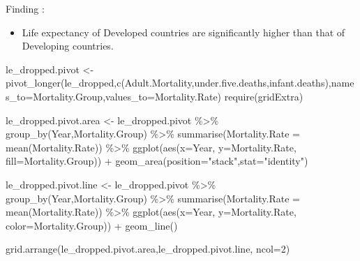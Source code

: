 \documentclass[
]{article}
\newenvironment{Shaded}{\begin{snugshade}}{\end{snugshade}}
\newcommand{\AttributeTok}[1]{\textcolor[rgb]{0.77,0.63,0.00}{#1}}
\newcommand{\DecValTok}[1]{\textcolor[rgb]{0.00,0.00,0.81}{#1}}
\newcommand{\FunctionTok}[1]{\textcolor[rgb]{0.00,0.00,0.00}{#1}}
\newcommand{\NormalTok}[1]{#1}
\newcommand{\OtherTok}[1]{\textcolor[rgb]{0.56,0.35,0.01}{#1}}
\newcommand{\SpecialCharTok}[1]{\textcolor[rgb]{0.00,0.00,0.00}{#1}}
\newcommand{\StringTok}[1]{\textcolor[rgb]{0.31,0.60,0.02}{#1}}
\providecommand{\tightlist}{%
  \setlength{\itemsep}{0pt}\setlength{\parskip}{0pt}}
\begin{document}
Finding :

\begin{itemize}
\tightlist
\item
  Life expectancy of Developed countries are significantly higher than
  that of Developing countries.
\end{itemize}

\begin{Shaded}
\begin{Highlighting}[]
\NormalTok{le\_dropped.pivot }\OtherTok{\textless{}{-}} \FunctionTok{pivot\_longer}\NormalTok{(le\_dropped,}\FunctionTok{c}\NormalTok{(Adult.Mortality,under.five.deaths,infant.deaths),}\AttributeTok{names\_to=}\StringTok{\textquotesingle{}Mortality.Group\textquotesingle{}}\NormalTok{,}\AttributeTok{values\_to=}\StringTok{\textquotesingle{}Mortality.Rate\textquotesingle{}}\NormalTok{)}
\FunctionTok{require}\NormalTok{(gridExtra)}

\NormalTok{le\_dropped.pivot.area }\OtherTok{\textless{}{-}}\NormalTok{ le\_dropped.pivot }\SpecialCharTok{\%\textgreater{}\%}
  \FunctionTok{group\_by}\NormalTok{(Year,Mortality.Group) }\SpecialCharTok{\%\textgreater{}\%}
  \FunctionTok{summarise}\NormalTok{(}\AttributeTok{Mortality.Rate =} \FunctionTok{mean}\NormalTok{(Mortality.Rate)) }\SpecialCharTok{\%\textgreater{}\%}
  \FunctionTok{ggplot}\NormalTok{(}\FunctionTok{aes}\NormalTok{(}\AttributeTok{x=}\NormalTok{Year,}
             \AttributeTok{y=}\NormalTok{Mortality.Rate,}
             \AttributeTok{fill=}\NormalTok{Mortality.Group)) }\SpecialCharTok{+}
  \FunctionTok{geom\_area}\NormalTok{(}\AttributeTok{position=}\StringTok{"stack"}\NormalTok{,}\AttributeTok{stat=}\StringTok{"identity"}\NormalTok{)}

\NormalTok{le\_dropped.pivot.line }\OtherTok{\textless{}{-}}\NormalTok{ le\_dropped.pivot }\SpecialCharTok{\%\textgreater{}\%}
  \FunctionTok{group\_by}\NormalTok{(Year,Mortality.Group) }\SpecialCharTok{\%\textgreater{}\%}
  \FunctionTok{summarise}\NormalTok{(}\AttributeTok{Mortality.Rate =} \FunctionTok{mean}\NormalTok{(Mortality.Rate)) }\SpecialCharTok{\%\textgreater{}\%}
  \FunctionTok{ggplot}\NormalTok{(}\FunctionTok{aes}\NormalTok{(}\AttributeTok{x=}\NormalTok{Year,}
             \AttributeTok{y=}\NormalTok{Mortality.Rate,}
             \AttributeTok{color=}\NormalTok{Mortality.Group)) }\SpecialCharTok{+}
  \FunctionTok{geom\_line}\NormalTok{()}

\FunctionTok{grid.arrange}\NormalTok{(le\_dropped.pivot.area,le\_dropped.pivot.line, }\AttributeTok{ncol=}\DecValTok{2}\NormalTok{)}
\end{Highlighting}
\end{Shaded}
\end{document}
